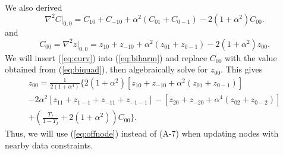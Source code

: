 \documentclass[12pt,letterpaper,margin=0.5in]{article}
\begin{document}
We also derived
\begin{equation}
\nabla^2 C \rvert _{0, 0} = C_{10} + C_{-10} + \alpha^2(C_{01} + C_{0-1}) - 2 (1+\alpha^2)C_{00}.
\label{eq:curv}
\end{equation}
and
\begin{equation}
C_{00} = \nabla^2 z \rvert _{0, 0} = z_{10} + z_{-10} + \alpha^2(z_{01} + z_{0-1}) - 2 (1+\alpha^2)z_{00}.
\end{equation}
We will insert (\ref{eq:curv}) into (\ref{eq:biharm}) and replace $C_{00}$ with the value obtained from (\ref{eq:biquad}), then algebraically solve for $z_{00}$.
This gives
\begin{equation}
\begin{split}
z_{00} = \frac{1}{2(1+\alpha^4)} \{ 2(1+\alpha^2) \left [ z_{10}+z_{-10}+\alpha^2(z_{01}+z_{0-1})\right ] \\
	-2\alpha^2\left [z_{11} + z_{1-1} + z_{-11} + z_{-1-1}\right ] - \left [z_{20} + z_{-20} + \alpha^4 (z_{02} + z_{0-2})\right ] \\
	+ \left (\frac{T_I}{1-T_I} + 2(1+\alpha^2)\right )C_{00} \}.
\label{eq:offnode}
\end{split}
\end{equation}
Thus, we will use (\ref{eq:offnode}) instead of (A-7) when updating nodes with nearby data constraints.
\end{document}
